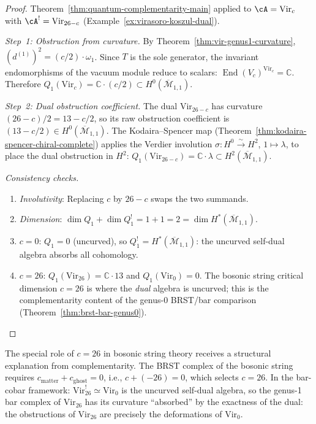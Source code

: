 \begin{proof}
Theorem~\ref{thm:quantum-complementarity-main} applied to
$\cA = \mathrm{Vir}_c$ with $\cA^! = \mathrm{Vir}_{26-c}$
(Example~\ref{ex:virasoro-koszul-dual}).

\emph{Step~1: Obstruction from curvature.}
By Theorem~\ref{thm:vir-genus1-curvature},
$(d^{(1)})^2 = (c/2) \cdot \omega_1$.  Since $T$ is the sole generator,
the invariant endomorphisms of the vacuum module reduce to scalars:
$\operatorname{End}(V_c)^{\mathrm{Vir}_c} = \mathbb{C}$.
Therefore $Q_1(\mathrm{Vir}_c) = \mathbb{C} \cdot (c/2) \subset
H^0(\overline{\mathcal{M}}_{1,1})$.

\emph{Step~2: Dual obstruction coefficient.}
The dual $\mathrm{Vir}_{26-c}$ has curvature $(26-c)/2 = 13 - c/2$, so
its raw obstruction coefficient is $(13 - c/2) \in H^0(\overline{\mathcal{M}}_{1,1})$.
The Kodaira--Spencer map (Theorem~\ref{thm:kodaira-spencer-chiral-complete})
applies the Verdier involution $\sigma\colon H^0 \xrightarrow{\sim} H^2$,
$1 \mapsto \lambda$, to place the dual obstruction in $H^2$:
$Q_1(\mathrm{Vir}_{26-c}) = \mathbb{C} \cdot \lambda \subset
H^2(\overline{\mathcal{M}}_{1,1})$.

\emph{Consistency checks.}
\begin{enumerate}
\item \emph{Involutivity}: Replacing $c$ by $26-c$ swaps the two
  summands. \checkmark
\item \emph{Dimension}: $\dim Q_1 + \dim Q_1^! = 1 + 1 = 2 =
  \dim H^*(\overline{\mathcal{M}}_{1,1})$. \checkmark
\item \emph{$c = 0$}: $Q_1 = 0$ (uncurved), so $Q_1^! =
  H^*(\overline{\mathcal{M}}_{1,1})$: the uncurved self-dual algebra absorbs
  all cohomology. \checkmark
\item \emph{$c = 26$}: $Q_1(\mathrm{Vir}_{26}) = \mathbb{C} \cdot 13$
  and $Q_1(\mathrm{Vir}_0) = 0$.  The bosonic string critical dimension
  $c = 26$ is where the \emph{dual} algebra is uncurved; this is the
  complementarity content of the genus-$0$ BRST/bar comparison
  \textup{(}Theorem~\ref{thm:brst-bar-genus0}\textup{)}. \checkmark
\end{enumerate}
\end{proof}

\begin{remark}\label{rem:vir-bosonic-string}
The special role of $c = 26$ in bosonic string theory receives a
structural explanation from complementarity.  The BRST complex of the
bosonic string requires $c_{\mathrm{matter}} + c_{\mathrm{ghost}} = 0$,
i.e., $c + (-26) = 0$, which selects $c = 26$.  In the bar-cobar framework:
$\mathrm{Vir}_{26}^! \simeq \mathrm{Vir}_0$ is the uncurved self-dual
algebra, so the genus-1 bar complex of $\mathrm{Vir}_{26}$ has its
curvature ``absorbed'' by the exactness of the dual: the obstructions
of $\mathrm{Vir}_{26}$ are precisely the deformations of $\mathrm{Vir}_0$.
\end{remark}


